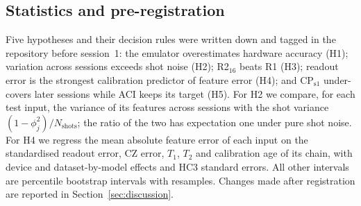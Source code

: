 \subsection{Statistics and pre-registration}
Five hypotheses and their decision rules were written down and tagged in the repository before
session~1: the emulator overestimates hardware accuracy (H1); variation across sessions exceeds
shot noise (H2); R2$_{16}$ beats R1 (H3); readout error is the strongest calibration predictor
of feature error (H4); and CP$_\mathrm{s1}$ under-covers later sessions while ACI keeps its
target (H5). For H2 we compare, for each test input, the variance of its features across
sessions with the shot variance $(1-\phi_j^2)/N_{\mathrm{shots}}$; the ratio of the two has
expectation one under pure shot noise. For H4 we regress the mean absolute feature error of each
input on the standardised readout error, CZ error, $T_1$, $T_2$ and calibration age of its
chain, with device and dataset-by-model effects and HC3 standard errors. All other intervals are
percentile bootstrap intervals with  resamples. Changes made after registration
are reported in Section~\ref{sec:discussion}.



